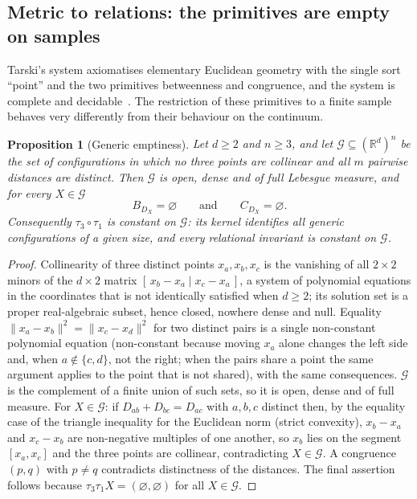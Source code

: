 \documentclass[11pt,a4paper]{article}
\theoremstyle{plain}
\newtheorem{proposition}[theorem]{Proposition}
\theoremstyle{definition}
\theoremstyle{remark}
\newcommand{\R}{\mathbb{R}}
\begin{document}
\subsection{Metric to relations: the primitives are empty on samples}

Tarski's system axiomatises elementary Euclidean geometry with the single sort ``point'' and the two primitives betweenness and congruence, and the system is complete and decidable~\citep{tarski1959,tarskigivant1999}. The restriction of these primitives to a finite sample behaves very differently from their behaviour on the continuum.

\begin{proposition}[Generic emptiness]\label{prop:empty}
Let $d\ge 2$ and $n\ge 3$, and let $\mathcal G\subseteq(\R^d)^n$ be the set of configurations in which no three points are collinear and all $m$ pairwise distances are distinct. Then $\mathcal G$ is open, dense and of full Lebesgue measure, and for every $X\in\mathcal G$
\[
B_{D_X}=\varnothing\qquad\text{and}\qquad C_{D_X}=\varnothing .
\]
Consequently $\tau_3\circ\tau_1$ is constant on $\mathcal G$: its kernel identifies all generic configurations of a given size, and every relational invariant is constant on $\mathcal G$.
\end{proposition}
\begin{proof}
Collinearity of three distinct points $x_a,x_b,x_c$ is the vanishing of all $2\times 2$ minors of the $d\times 2$ matrix $[\,x_b-x_a\mid x_c-x_a\,]$, a system of polynomial equations in the coordinates that is not identically satisfied when $d\ge2$; its solution set is a proper real-algebraic subset, hence closed, nowhere dense and null. Equality $\lVert x_a-x_b\rVert^2=\lVert x_c-x_d\rVert^2$ for two distinct pairs is a single non-constant polynomial equation (non-constant because moving $x_a$ alone changes the left side and, when $a\notin\{c,d\}$, not the right; when the pairs share a point the same argument applies to the point that is not shared), with the same consequences. $\mathcal G$ is the complement of a finite union of such sets, so it is open, dense and of full measure. For $X\in\mathcal G$: if $D_{ab}+D_{bc}=D_{ac}$ with $a,b,c$ distinct then, by the equality case of the triangle inequality for the Euclidean norm (strict convexity), $x_b-x_a$ and $x_c-x_b$ are non-negative multiples of one another, so $x_b$ lies on the segment $[x_a,x_c]$ and the three points are collinear, contradicting $X\in\mathcal G$. A congruence $(p,q)$ with $p\ne q$ contradicts distinctness of the distances. The final assertion follows because $\tau_3\tau_1 X=(\varnothing,\varnothing)$ for all $X\in\mathcal G$.
\end{proof}
\end{document}
